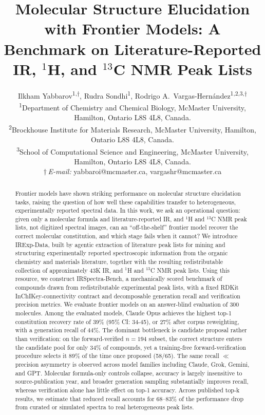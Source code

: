 \documentclass{article}
\title{Molecular Structure Elucidation with Frontier Models: A Benchmark on Literature-Reported IR, $^1$H, and $^{13}$C NMR Peak Lists}
\author{
Ilkham Yabbarov\textsuperscript{1,$\dagger$},
Rudra Sondhi\textsuperscript{1},
Rodrigo A.\ Vargas-Hern\'andez\textsuperscript{1,2,3,$\dagger$}\\
\textsuperscript{1}Department of Chemistry and Chemical Biology, McMaster University,
Hamilton, Ontario L8S 4L8, Canada.\\
\textsuperscript{2}Brockhouse Institute for Materials Research, McMaster University,
Hamilton, Ontario L8S 4L8, Canada.\\
\textsuperscript{3}School of Computational Science and Engineering, McMaster University,
Hamilton, Ontario L8S 4L8, Canada.\\
$\dagger$\,\textit{E-mail:} yabbaroi@mcmaster.ca, vargashr@mcmaster.ca
}
\begin{document}
\maketitle
{}

\begin{abstract}
Frontier models have shown striking performance on molecular structure elucidation tasks, raising the question of how well these capabilities transfer to heterogeneous, experimentally reported spectral data. In this work, we ask an operational question: given only a molecular formula and literature-reported IR, and $^1$H and $^{13}$C NMR peak lists, not digitized spectral images, can an ``off-the-shelf'' frontier model recover the correct molecular constitution, and which stage fails when it cannot? We introduce IRExp-Data, built by agentic extraction of literature peak lists for mining and structuring experimentally reported spectroscopic information from the organic chemistry and materials literature, together with the resulting redistributable collection of approximately 43K IR, and $^1$H and $^{13}$C NMR peak lists. Using this resource, we construct IRSpectra-Bench, a mechanically scored benchmark of compounds drawn from redistributable experimental peak lists, with a fixed RDKit InChIKey-connectivity contract and decomposable generation recall and verification precision metrics. We evaluate frontier models on an answer-blind evaluation of 300 molecules. Among the evaluated models, Claude Opus achieves the highest top-1 constitution recovery rate of 39\% (95\% CI: 34-45), or 27\% after corpus reweighting, with a generation recall of 44\%. The dominant bottleneck is candidate proposal rather than verification: on the forward-verified $n=194$ subset, the correct structure enters the candidate pool for only 34\% of compounds, yet a training-free forward-verification procedure selects it 89\% of the time once proposed (58/65). The same recall $\ll$ precision asymmetry is observed across model families including Claude, Grok, Gemini, and GPT. Molecular formula-only controls collapse, accuracy is largely insensitive to source-publication year, and broader generation sampling substantially improves recall, whereas verification alone has little effect on top-1 accuracy. Across published top-k results, we estimate that reduced recall accounts for 68–83\% of the performance drop from curated or simulated spectra to real heterogeneous peak lists. 
\end{abstract}
\end{document}
